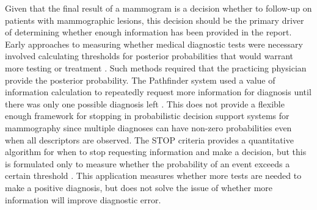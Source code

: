 Given that the final result of a mammogram is a decision whether to follow-up on patients with mammographic lesions, this decision should be the primary driver of determining whether enough information has been provided in the report. 
Early approaches to measuring whether medical diagnostic tests were necessary involved calculating thresholds for posterior probabilities that would warrant more testing or treatment \cite{Pauker:1980cg}. 
Such methods required that the practicing physician provide the posterior probability. 
The Pathfinder system used a value of information calculation to repeatedly request more information for diagnosis until there was only one possible diagnosis left \cite{Heckerman:1992uq}.
This does not provide a flexible enough framework for stopping in probabilistic decision support systems for mammography since multiple diagnoses can have non-zero probabilities even when all descriptors are observed.
The STOP criteria provides a quantitative algorithm for when to stop requesting information and make a decision, but this is formulated only to measure whether the probability of an event exceeds a certain threshold \cite{Gaag:2011gs}.
This application measures whether more tests are needed to make a positive diagnosis, but does not solve the issue of whether more information will improve diagnostic error.